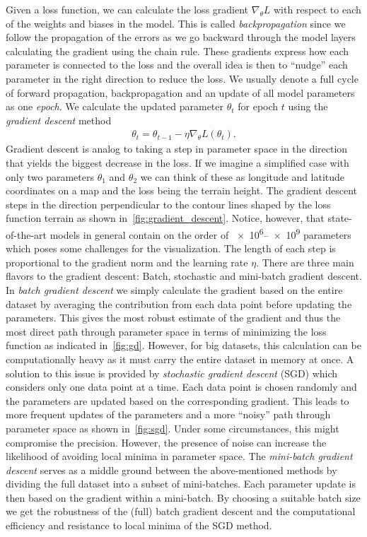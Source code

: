 Given a loss function, we can calculate the loss gradient $\nabla_\theta L$ with respect to each of the weights and biases in the model. This is called \textit{backpropagation} since we follow the propagation of the errors as we go backward through the model layers calculating the gradient using the chain rule. These gradients express how each parameter is connected to the loss and the overall idea is then to ``nudge'' each parameter in the right direction to reduce the loss. We usually denote a full cycle of forward propagation, backpropagation and an update of all model parameters as one \textit{epoch}. We calculate the updated parameter $\theta_t$ for epoch $t$ using the \textit{gradient descent} method
\begin{align}
  \theta_{t} = \theta_{t-1} - \eta \nabla_\theta L(\theta_t).
  \label{eq:grad_descent}
\end{align}
Gradient descent is analog to taking a step in parameter space in the direction
that yields the biggest decrease in the loss. If we imagine a simplified case
with only two parameters $\theta_1$ and $\theta_2$ we can think of these as longitude and latitude coordinates on a map and the loss being the terrain height. The gradient descent steps in the direction perpendicular to the contour lines shaped by the loss function terrain as shown in~\cref{fig:gradient_descent}. Notice, however, that state-of-the-art models in general contain on the order of \num{e6}--\num{e9} parameters~\cite{thompson2022computational} which poses some challenges for the visualization.  The length of each step is proportional to the gradient norm and the learning rate $\eta$. There are three main flavors to the gradient descent: Batch,
stochastic and mini-batch gradient descent. In \textit{batch gradient descent} we simply
calculate the gradient based on the entire dataset by averaging the contribution
from each data point before updating the parameters. This gives the most robust estimate of the gradient and thus the most direct path through parameter space in terms of minimizing the loss function as
indicated in~\cref{fig:gd}. However, for big datasets, this calculation can be
computationally heavy as it must carry the entire dataset in memory at once. A
solution to this issue is provided by \textit{stochastic gradient descent}
(\acrshort{SGD}) which considers only one data point at a time. Each data point is chosen randomly and the parameters are updated based on the corresponding gradient. This leads to more frequent updates of the parameters and a more ``noisy'' path through parameter space as shown in~\cref{fig:sgd}. Under some circumstances, this might compromise the precision. However, the presence of noise can increase the likelihood of avoiding local minima in parameter space. The \textit{mini-batch gradient descent} serves as a middle ground between the above-mentioned methods by dividing the full dataset into a subset of mini-batches. Each parameter update is then based on the gradient within a mini-batch. By choosing a suitable batch size we get the robustness of the (full) batch gradient descent and the computational efficiency and resistance to local minima of the \acrshort{SGD} method. 


